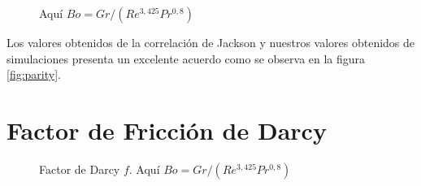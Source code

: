 \begin{figure}[H]
  \centering
    
  \caption{Aquí $Bo = Gr / (Re^{3,425} Pr^{0,8})$}
  \label{fig:nusselt}
\end{figure}

Los valores obtenidos de la correlación de Jackson y nuestros valores obtenidos de simulaciones presenta un excelente acuerdo como se observa en la figura \ref{fig:parity}. 

\newpage
\section{Factor de Fricción de Darcy}

\begin{figure}[H]
  \centering
  \caption{Factor de Darcy $ f$. Aquí $Bo = Gr / (Re^{3,425} Pr^{0,8})$}
  \label{fig:darcy_vs_bo}
\end{figure}